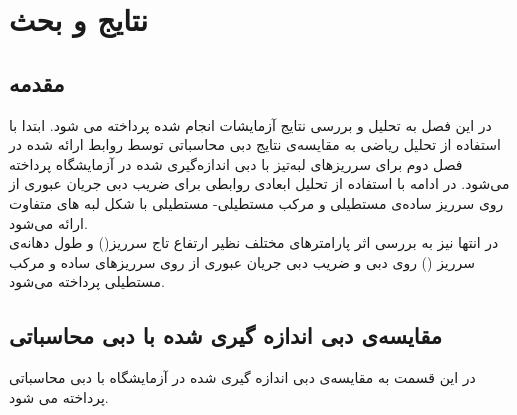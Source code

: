 \chapter{نتایج و بحث}
\section{مقدمه}
در این فصل به تحلیل و بررسی نتایج آزمایشات انجام شده پرداخته می شود. ابتدا با استفاده از تحلیل ریاضی به مقایسه‌ی نتایج دبی محاسباتی توسط روابط ارائه شده در فصل دوم برای سرریزهای لبه‌تیز با دبی اندازه‌گیری شده در آزمایشگاه پرداخته می‌شود. در ادامه با استفاده از تحلیل ابعادی روابطی برای  ضریب دبی جریان عبوری از روی سرریز ساده‌ی مستطیلی و مرکب مستطیلی- مستطیلی با شکل لبه های متفاوت ارائه می‌شود.\\
در انتها نیز به بررسی اثر پارامترهای مختلف نظیر ارتفاع تاج سرریز() و طول دهانه‌ی سرریز () روی دبی و ضریب دبی جریان عبوری از روی سرریزهای ساده و مرکب مستطیلی پرداخته می‌شود.
\section{مقایسه‌ی دبی اندازه گیری شده با دبی محاسباتی}
در این قسمت به مقایسه‌ی دبی اندازه گیری شده در آزمایشگاه با دبی محاسباتی پرداخته می شود.
